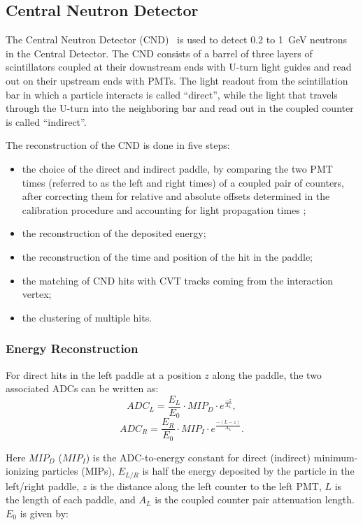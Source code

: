\subsection{Central Neutron Detector}
\label{sec_rec_cnd}

The Central Neutron Detector (CND)~\cite{cnd-nim} is used to detect 0.2 to 1~GeV neutrons in the Central Detector.
The CND consists of a barrel of three layers of scintillators coupled at their downstream ends with U-turn light
guides and read out on their upstream ends with PMTs. The light readout from the scintillation bar in which a particle
interacts is called ``direct'', while the light that travels through the U-turn into the neighboring bar and read out
in the coupled counter is called ``indirect''. 

The reconstruction of the CND is done in five steps:

\begin{itemize}
\item the choice of the direct and indirect paddle, by comparing the two PMT times (referred to as the left and
  right times) of a coupled pair of counters, after correcting them for relative and absolute offsets determined in
  the calibration procedure and accounting for light propagation times \cite{cnd-nim};
\item the reconstruction of the deposited energy;
\item the reconstruction of the time and position of the hit in the paddle;
\item the matching of CND hits with CVT tracks coming from the interaction vertex;
\item the clustering of multiple hits.
\end{itemize}

\subsubsection{Energy Reconstruction}

For direct hits in the left paddle at a position $z$ along the paddle, the two associated ADCs can be written as:
\begin{equation}
\label{eq_adc}
ADC_L = \frac{E_L}{E_0} \cdot MIP_D \cdot e^{\frac{-z}{A_L}},
\end{equation}
\begin{equation}
ADC_R = \frac{E_R}{E_0} \cdot MIP_I \cdot e^{\frac{-(L-z)}{A_L}}.\nonumber
\end{equation}

\noindent
Here $MIP_D$ ($MIP_I$) is the ADC-to-energy constant for direct (indirect) minimum-ionizing particles (MIPs),
$E_{L/R}$ is half the energy deposited by the particle in the left/right paddle, $z$ is the distance along the
left counter to the left PMT, $L$ is the length of each paddle, and $A_L$ is the coupled counter pair attenuation
length. $E_0$ is given by:

